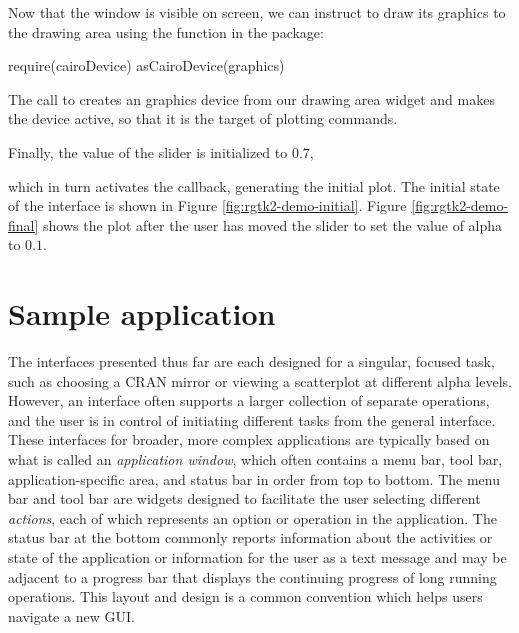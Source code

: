 \documentclass[article,shortnames]{jss}
\begin{document}
Now that the window is visible on screen, we can instruct 
to draw its graphics to the drawing area using the
 function in the  package:
\begin{Code}
require(cairoDevice)
asCairoDevice(graphics)
\end{Code}
The call to  creates an  graphics
device from our drawing area widget and makes the device active, so
that it is the target of  plotting commands.

Finally, the value of the slider is initialized to $0.7$,
which in turn activates the callback, generating the initial plot. The
initial state of the interface is shown in Figure
\ref{fig:rgtk2-demo-initial}.  Figure \ref{fig:rgtk2-demo-final} shows
the plot after the user has moved the slider to set the value of alpha
to $0.1$.


\section{Sample application}\label{sec:spreadsheet-example}

The interfaces presented thus far are each designed for a singular,
focused task, such as choosing a CRAN mirror or viewing a scatterplot
at different alpha levels.  However, an interface often supports a
larger collection of separate operations, and the user is in control
of initiating different tasks from the general interface. These
interfaces for broader, more complex
applications are typically based on what is called an
\emph{application window}, which often contains a menu bar, tool bar,
application-specific area, and status bar in order from top to
bottom. The menu bar and tool bar are widgets designed to facilitate
the user selecting different \emph{actions}, each of which represents
an option or operation in the application.  The status bar at the
bottom commonly reports information about the activities or state of
the application or information for the user as a text message and may
be adjacent to a progress bar that displays the continuing progress of
long running operations.  This layout and design is a common
convention which helps users navigate a new GUI.
\end{document}
